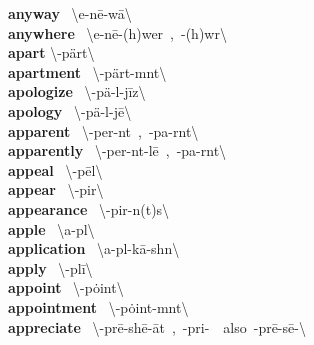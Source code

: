 \documentclass[10pt,a4paper]{article}
\begin{document}
\begin{multicols}{2}
\textbf{ anyway }\quad \ \textbackslash \textprimstress e-n\={e}-\textsecstress w\={a}\textbackslash \\
\textbf{ anywhere }\quad \ \textbackslash \textprimstress e-n\={e}-\textsecstress (h)wer\ ,\ -(h)w\textschwa r\textbackslash \\
\textbf{ apart }\quad \textbackslash \textschwa -\textprimstress p\"{a}rt\textbackslash \\
\textbf{ apartment }\quad \ \textbackslash \textschwa -\textprimstress p\"{a}rt-m\textschwa nt\textbackslash \\
\textbf{ apologize }\quad \ \textbackslash \textschwa -\textprimstress p\"{a}-l\textschwa -\textsecstress j\={i}z\textbackslash \\
\textbf{ apology }\quad \ \textbackslash \textschwa -\textprimstress p\"{a}-l\textschwa -j\={e}\textbackslash \\
\textbf{ apparent }\quad \ \textbackslash \textschwa -\textprimstress per-\textschwa nt\ ,\ -\textprimstress pa-r\textschwa nt\textbackslash \\
\textbf{ apparently }\quad \ \textbackslash \textschwa -\textprimstress per-\textschwa nt-l\={e}\ ,\ -\textprimstress pa-r\textschwa nt\textbackslash \\
\textbf{ appeal }\quad \ \textbackslash \textschwa -\textprimstress p\={e}l\textbackslash \\
\textbf{ appear }\quad \ \textbackslash \textschwa -\textprimstress pir\textbackslash \\
\textbf{ appearance }\quad \ \textbackslash \textschwa -\textprimstress pir-\textschwa n(t)s\textbackslash \\
\textbf{ apple }\quad \ \textbackslash \textprimstress a-p\textschwa l\textbackslash \\
\textbf{ application }\quad \ \textbackslash \textsecstress a-pl\textschwa -\textprimstress k\={a}-sh\textschwa n\textbackslash \\
\textbf{ apply }\quad \ \textbackslash \textschwa -\textprimstress pl\={i}\textbackslash \\
\textbf{ appoint }\quad \ \textbackslash \textschwa -\textprimstress p\.{o}int\textbackslash \\
\textbf{ appointment }\quad \ \textbackslash \textschwa -\textprimstress p\.{o}int-m\textschwa nt\textbackslash \\
\textbf{ appreciate }\quad \ \textbackslash \textschwa -\textprimstress pr\={e}-sh\={e}-\textsecstress \={a}t\ ,\ -\textprimstress pri-\ \ also\ -\textprimstress pr\={e}-s\={e}-\textbackslash \\

\end{multicols}
\end{document}
